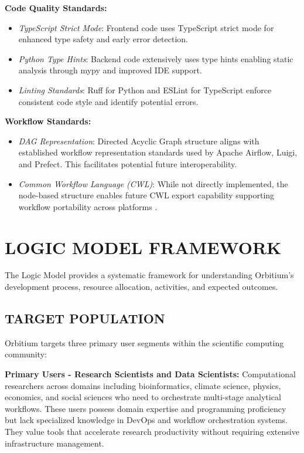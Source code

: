\documentclass[12pt]{article}
\begin{document}
\textbf{Code Quality Standards:}
\begin{itemize}
    \item \textit{TypeScript Strict Mode}: Frontend code uses TypeScript strict mode for enhanced type safety and early error detection.
    
    \item \textit{Python Type Hints}: Backend code extensively uses type hints enabling static analysis through mypy and improved IDE support.
    
    \item \textit{Linting Standards}: Ruff for Python and ESLint for TypeScript enforce consistent code style and identify potential errors.
\end{itemize}

\textbf{Workflow Standards:}
\begin{itemize}
    \item \textit{DAG Representation}: Directed Acyclic Graph structure aligns with established workflow representation standards used by Apache Airflow, Luigi, and Prefect. This facilitates potential future interoperability.
    
    \item \textit{Common Workflow Language (CWL)}: While not directly implemented, the node-based structure enables future CWL export capability supporting workflow portability across platforms \cite{amstutz2016common}.
\end{itemize}

\newpage
\section{LOGIC MODEL FRAMEWORK}

\hspace{\parindent}The Logic Model provides a systematic framework for understanding Orbitium's development process, resource allocation, activities, and expected outcomes.

\subsection{TARGET POPULATION}

\hspace{\parindent}Orbitium targets three primary user segments within the scientific computing community:

\hspace{\parindent}\textbf{Primary Users - Research Scientists and Data Scientists:} Computational researchers across domains including bioinformatics, climate science, physics, economics, and social sciences who need to orchestrate multi-stage analytical workflows. These users possess domain expertise and programming proficiency but lack specialized knowledge in DevOps and workflow orchestration systems. They value tools that accelerate research productivity without requiring extensive infrastructure management.
\end{document}
